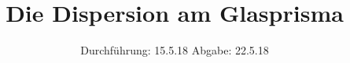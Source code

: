 

\subject{V402}
\title{Die Dispersion am Glasprisma}
\date{%
  Durchführung: 15.5.18
  \hspace{3em}
  Abgabe: 22.5.18
}



\maketitle
\thispagestyle{empty}
\tableofcontents
\newpage






\printbibliography{}


